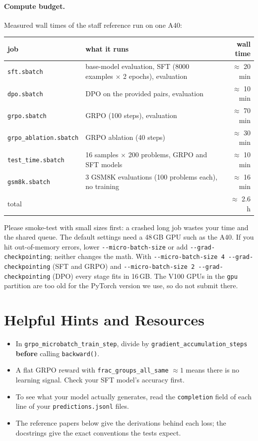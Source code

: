 \documentclass[11pt]{article}
\newcommand{\file}[1]{\texttt{#1}}
\begin{document}
\paragraph{Compute budget.} Measured wall times of the staff reference run on one A40:
\begin{center}
\begin{tabular}{@{}lp{6.6cm}r@{}}
\toprule
job & what it runs & wall time \\
\midrule
\file{sft.sbatch} & base-model evaluation, SFT (8000 examples $\times$ 2 epochs), evaluation & $\approx$ 20 min \\
\file{dpo.sbatch} & DPO on the provided pairs, evaluation & $\approx$ 10 min \\
\file{grpo.sbatch} & GRPO (100 steps), evaluation & $\approx$ 70 min \\
\file{grpo\_ablation.sbatch} & GRPO ablation (40 steps) & $\approx$ 30 min \\
\file{test\_time.sbatch} & 16 samples $\times$ 200 problems, GRPO and SFT models & $\approx$ 10 min \\
\file{gsm8k.sbatch} & 3 GSM8K evaluations (100 problems each), no training & $\approx$ 16 min \\
\midrule
total & & $\approx$ 2.6 h \\
\bottomrule
\end{tabular}
\end{center}
Please smoke-test with small sizes first: a crashed long job wastes your time and the shared queue. The default
settings need a 48\,GB GPU such as the A40. If you hit out-of-memory errors, lower \texttt{-{}-micro-batch-size} or
add \texttt{-{}-grad-checkpointing}; neither changes the math. With \texttt{-{}-micro-batch-size 4 -{}-grad-checkpointing}
(SFT and GRPO) and \texttt{-{}-micro-batch-size 2 -{}-grad-checkpointing} (DPO) every stage fits in 16\,GB. The V100
GPUs in the \texttt{gpu} partition are too old for the PyTorch version we use, so do not submit there.

\section*{Helpful Hints and Resources}
\begin{itemize}
  \item In \texttt{grpo\_microbatch\_train\_step}, divide by \texttt{gradient\_accumulation\_steps}
        \textbf{before} calling \texttt{backward()}.
  \item A flat GRPO reward with \texttt{frac\_groups\_all\_same} $\approx 1$ means there is no learning signal.
        Check your SFT model's accuracy first.
  \item To see what your model actually generates, read the \texttt{completion} field of each line of
        your \file{predictions.jsonl} files.
  \item The reference papers below give the derivations behind each loss; the docstrings give the exact
        conventions the tests expect.
\end{itemize}
\end{document}
